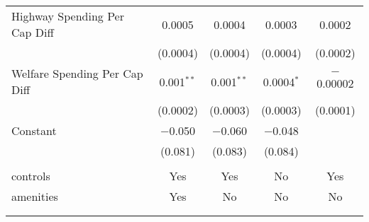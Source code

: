 \begin{table}[!htbp]
\begin{tabular}{@{\extracolsep{5pt}}lcccc}
  Highway Spending Per Cap Diff & 0.0005 & 0.0004 & 0.0003 & 0.0002 \\ 
  & (0.0004) & (0.0004) & (0.0004) & (0.0002) \\ 
  Welfare Spending Per Cap Diff & 0.001$^{**}$ & 0.001$^{**}$ & 0.0004$^{*}$ & $-$0.00002 \\ 
  & (0.0002) & (0.0003) & (0.0003) & (0.0001) \\ 
  Constant & $-$0.050 & $-$0.060 & $-$0.048 &  \\ 
  & (0.081) & (0.083) & (0.084) &  \\ 
 \hline \\[-1.8ex] 
controls & Yes & Yes & No & Yes \\ 
amenities & Yes & No & No & No \\ 
\hline \\[-1.8ex] 
\hline 
\hline \\[-1.8ex] 
\end{tabular} 
\end{table} 

